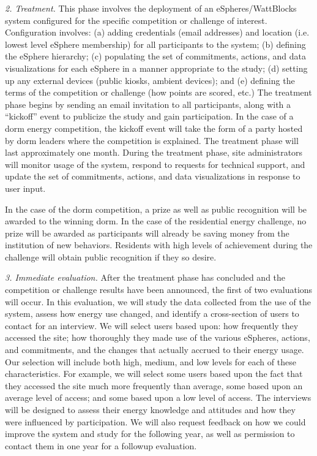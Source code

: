 {\em 2. Treatment.}  This phase involves the deployment of an
eSpheres/WattBlocks system configured for the specific competition or
challenge of interest.  Configuration involves: (a) adding credentials
(email addresses) and location (i.e. lowest level eSphere membership) for
all participants to the system; (b) defining the eSphere hierarchy; (c)
populating the set of commitments, actions, and data visualizations for
each eSphere in a manner appropriate to the study; (d) setting up any
external devices (public kiosks, ambient devices); and (e) defining the
terms of the competition or challenge (how points are scored, etc.)  The
treatment phase begins by sending an email invitation to all participants,
along with a ``kickoff'' event to publicize the study and gain
participation. In the case of a dorm energy competition, the kickoff event
will take the form of a party hosted by dorm leaders where the competition
is explained.  The treatment phase will last approximately one month.
During the treatment phase, site administrators will monitor usage of the
system, respond to requests for technical support, and update the set of
commitments, actions, and data visualizations in response to user input.

In the case of the dorm competition, a prize as well as public recognition
will be awarded to the winning dorm.  In the case of the residential energy
challenge, no prize will be awarded as participants will already be saving
money from the institution of new behaviors.  Residents with high levels of
achievement during the challenge will obtain public recognition if they so
desire.

{\em 3. Immediate evaluation.}  After the treatment phase has concluded and
the competition or challenge results have been announced, the first of two
evaluations will occur.  In this evaluation, we will study the data
collected from the use of the system, assess how energy use changed, 
and identify a cross-section of users to contact for an interview.  We will
select users based upon: how frequently they accessed the site; how
thoroughly they made use of the various eSpheres, actions, and commitments,
and the changes that actually accrued to their energy usage.  Our selection
will include both high, medium, and low levels for each of these
characteristics. For example, we will select some users based upon the fact
that they accessed the site much more frequently than average, some based
upon an average level of access; and some based upon a low level of access.
The interviews will be designed to assess their energy knowledge and
attitudes and how they were influenced by participation.  We will also
request feedback on how we could improve the system and study for the
following year, as well as permission to contact them in one year for a
followup evaluation.

